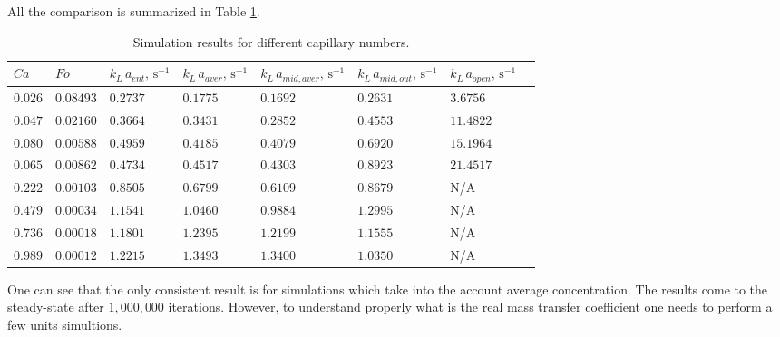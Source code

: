 \documentclass{article}
\newcommand{\vol}{k_L\,a}
\begin{document}
All the comparison is summarized in Table \ref{table:one_unit_comparison}.
\begin{table}[htb!]
\begin{tabularx}{\textwidth}{|X|X|X|X|X|X|X|X|}
\hline
$Ca$&$Fo$&$\vol_{ent},\,\mathrm{s}^{-1}$&$\vol_{aver},\,\mathrm{s}^{-1}$&$\vol_{mid,
aver},\,\mathrm{s} ^ { -1 }$&$\vol_{mid,out},\,\mathrm{s}^{-1}$&$\vol_{open},\,\mathrm{s}^{-1}$ \\
\hline
$0.026$&$0.08493$&$0.2737$&$0.1775$&$0.1692$&$0.2631$&$3.6756$\\
$0.047$&$0.02160$&$0.3664$&$0.3431$&$0.2852$&$0.4553$&$11.4822$\\
$0.080$&$0.00588$&$0.4959$&$0.4185$&$0.4079$&$0.6920$&$15.1964$\\
$0.065$&$0.00862$&$0.4734$&$0.4517$&$0.4303$&$0.8923$&$21.4517$\\
$0.222$&$0.00103$&$0.8505$&$0.6799$&$0.6109$&$0.8679$&N/A\\
$0.479$&$0.00034$&$1.1541$&$1.0460$&$0.9884$&$1.2995$&N/A\\
$0.736$&$0.00018$&$1.1801$&$1.2395$&$1.2199$&$1.1555$&N/A\\
$0.989$&$0.00012$&$1.2215$&$1.3493$&$1.3400$&$1.0350$&N/A\\
\hline
\end{tabularx}
\caption{Simulation results for different capillary numbers.
\label{table:one_unit_comparison}}
\end{table}
One can see that the only consistent result is for simulations which take into the account average
concentration. The results come to the steady-state after $1,000,000$ iterations. However, to
understand properly what is the real mass transfer coefficient one needs to perform a few units
simultions.
\end{document}
